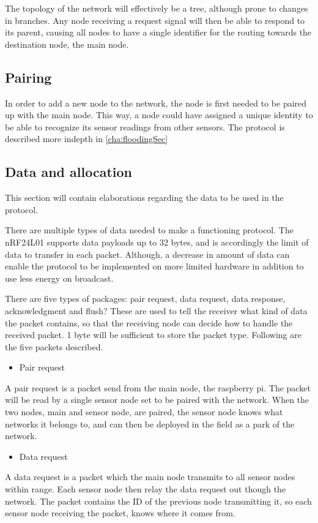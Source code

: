 The topology of the network will effectively be a tree, although prone to changes in branches.
Any node receiving a request signal will then be able to respond to its parent, causing all nodes to have a single identifier for the routing towards the destination node, the main node.

\subsection{Pairing}
In order to add a new node to the network, the node is first needed to be paired up with the main node.
This way, a node could have assigned a unique identity to be able to recognize its sensor readings from other sensors. 
The protocol is described more indepth in \ref{cha:floodingSec}

\subsection{Data and allocation}
This section will contain elaborations regarding the data to be used in the protocol.

There are multiple types of data needed to make a functioning protocol. The nRF24L01 supports data payloads up to 32 bytes, and is accordingly the limit of data to transfer in each packet.
Although, a decrease in amount of data can enable the protocol to be implemented on more limited hardware in addition to use less energy on broadcast.

There are five types of packages: pair request, data request, data response, acknowledgment and flush?
These are used to tell the receiver what kind of data the packet contains, so that the receiving node can decide how to handle the received packet. 1 byte will be sufficient to store the packet type.
Following are the five packets described.

\begin{itemize}
\item Pair request
\end{itemize}
A pair request is a packet send from the main node, the raspberry pi.
The packet will be read by a single sensor node set to be paired with the network.
When the two nodes, main and sensor node, are paired, the sensor node knows what networks it belongs to, and can then be deployed in the field as a park of the network. 

\begin{itemize}
\item Data request
\end{itemize}
A data request is a packet which the main node transmits to all sensor nodes within range.
Each sensor node then relay the data request out though the network.
The packet contains the ID of the previous node transmitting it, so each sensor node receiving the packet, knows where it comes from.


